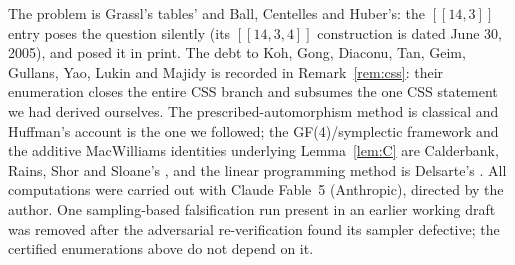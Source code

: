 \documentclass[11pt]{amsart}
\newcommand{\code}[3]{[[#1,#2,#3]]}
\theoremstyle{plain}
\theoremstyle{definition}
\theoremstyle{remark}
\begin{document}
The problem is Grassl's tables' and Ball, Centelles and Huber's: the
$[[14,3]]$ entry \cite{Grassl} poses the question silently (its
$\code{14}{3}{4}$ construction is dated June 30, 2005), and \cite{BCH}
posed it in print. The debt to Koh, Gong, Diaconu,
Tan, Geim, Gullans, Yao, Lukin and Majidy \cite{Koh26} is recorded in
Remark~\ref{rem:css}: their enumeration closes the entire CSS branch and
subsumes the one CSS statement we had derived ourselves. The
prescribed-automorphism method is classical and Huffman's account
\cite{Huffman98} is the one we followed; the GF(4)/symplectic framework
and the additive MacWilliams identities underlying Lemma~\ref{lem:C} are
Calderbank, Rains, Shor and Sloane's \cite{CRSS}, and the linear
programming method is Delsarte's \cite{Delsarte}. All computations were
carried out with Claude Fable~5 (Anthropic), directed by the author. One
sampling-based falsification run present in an earlier working draft was
removed after the adversarial re-verification found its sampler
defective; the certified enumerations above do not depend on it.
\end{document}
